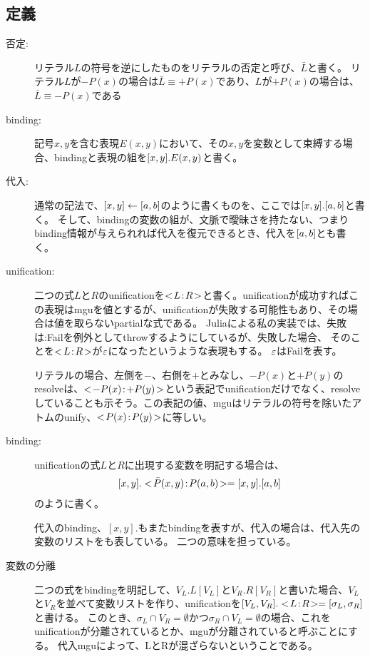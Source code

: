 \documentclass[10pt, onecolumn]{jarticle}   	%
\begin{document}
\subsection{定義}
\begin{description}
\item[ 否定: ] リテラル$L$の符号を逆にしたものをリテラルの否定と呼び、$\bar{L}$と書く。
リテラル$L$が$-P(x)$の場合は$\bar{L}\equiv +P(x)$であり、$L$が$+P(x)$の場合は、$\bar{L}\equiv -P(x)$である
\item[ binding: ] 記号$x,y$を含む表現$E(x,y)$において、その$x,y$を変数として束縛する場合、bindingと表現の組を$[x,y].E(x,y)$と書く。
\item[ 代入: ] 通常の記法で、$[x,y]\leftarrow[a,b]$のように書くものを、ここでは$[x,y].[a,b]$と書く。 そして、bindingの変数の組が、文脈で曖昧さを持たない、つまりbinding情報が与えられれば代入を復元できるとき、代入を$[a,b]$とも書く。
\item[ unification: ] 二つの式$L$と$R$のunificationを$<\!L\!:\!R\!>$と書く。unificationが成功すればこの表現はmguを値とするが、unificationが失敗する可能性もあり、その場合は値を取らないpartialな式である。
Juliaによる私の実装では、失敗は:Failを例外としてthrowするようにしているが、失敗した場合、
そのことを$<\!L\!:\!R\!>$が$\varepsilon$になったというような表現もする。
$\varepsilon$はFailを表す。

リテラルの場合、左側を$-$、右側を$+$とみなし、$-P(x)$と$+P(y)$のresolveは、$<\!\tiny{-}P(x)\!:\!\tiny{+}P(y)\!>$という表記でunificationだけでなく、resolveしていることも示そう。この表記の値、mguはリテラルの符号を除いたアトムのunify、$<\!P(x)\!:\!P(y)\!>$に等しい。

\item[ binding: ] unificationの式$L$と$R$に出現する変数を明記する場合は、
\begin{eqnarray*}
[x,y].<\!\bar{P}(x,y)\!:\!P(a,b)\!> = [x,y].[a,b]
\end{eqnarray*}
のように書く。

代入のbinding、$[x,y].$もまたbindingを表すが、代入の場合は、代入先の変数のリストをも表している。
二つの意味を担っている。

\item[変数の分離] 二つの式をbindingを明記して、$V_L.L[V_L]$と$V_R.R[V_R]$と書いた場合、$V_L$と$V_R$を並べて変数リストを作り、unificationを$[V_L,V_R].<\!L\!:\!R\!>=[\sigma_L,\sigma_R]$と書ける。
このとき、$\sigma_L \cap V_R=\emptyset$かつ$\sigma_R \cap V_L=\emptyset$の場合、これをunificationが分離されているとか、mguが分離されていると呼ぶことにする。
代入mguによって、LとRが混ざらないということである。


\end{description}
\end{document}
